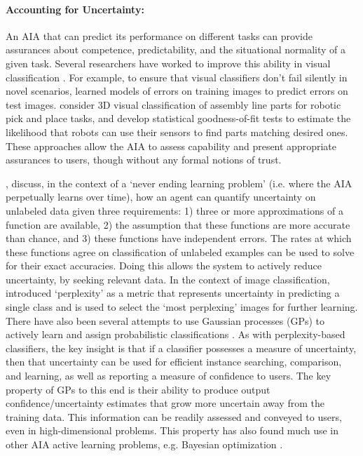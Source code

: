 \paragraph{Accounting for Uncertainty:} \label{sec:acct_uncertainty}
An AIA that can predict its performance on different tasks can provide assurances about competence, predictability, and the situational normality of a given task. Several researchers have worked to improve this ability in visual classification \cite{Zhang2014-he,Gurau2016-hs,Churchill2015-ei,Kaipa2015-hy}. 
For example, to ensure that visual classifiers don't fail silently in novel scenarios, \citet{Zhang2014-he} learned models of errors on training images to predict errors on test images. \citet{Kaipa2015-hy} consider 3D visual classification of assembly line parts for robotic pick and place tasks, and develop statistical goodness-of-fit tests to estimate the likelihood that robots can use their sensors to find parts matching desired ones. These approaches allow the AIA to assess capability and present appropriate assurances to users, though without any formal notions of trust. 

\citet{Mitchell2018-jw}, discuss, in the context of a `never ending learning problem' (i.e. where the AIA perpetually learns over time), how an agent can quantify uncertainty on unlabeled data given three requirements: 1) three or more approximations of a function are available, 2) the assumption that these functions are more accurate than chance, and 3) these functions have independent errors. The rates at which these functions agree on classification of unlabeled examples can be used to solve for their exact accuracies. Doing this allows the system to actively reduce uncertainty, by seeking relevant data.
In the context of image classification, \citet{Paul2011-vr} introduced `perplexity' as a metric that represents uncertainty in predicting a single class and is used to select the `most perplexing' images for further learning. There have also been several attempts to use Gaussian processes (GPs) to actively learn and assign probabilistic classifications \cite{MacKay1992-sp,Triebel2016-kj,Triebel2013-ow,Triebel2013-ku,Grimmett2013-gj,Grimmett2016-yc,Berczi2015-rd,Dequaire2016-kh}. As with perplexity-based classifiers, the key insight is that if a classifier possesses a measure of uncertainty, then that uncertainty can be used for efficient instance searching, comparison, and learning, as well as reporting a measure of confidence to users. The key property of GPs to this end is their ability to produce output confidence/uncertainty estimates that grow more uncertain away from the training data. This information can be readily assessed and conveyed to users, even in high-dimensional problems. This property has also found much use in other AIA active learning problems, e.g. Bayesian optimization \cite{Snoek2012-tt, Brochu2010-tj,Israelsen2017-zb}.


